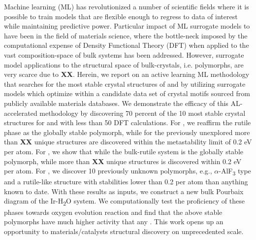 %



%
Machine learning (ML) has revolutionized a number of scientific fields where it is possible to train models that are flexible enough to regress to data of interest while maintaining predictive power.
%
Particular impact of ML surrogate models to  have been in the field of materials science,
where the bottle-neck imposed by the computational expense of Density Functional Theory (DFT) when applied to the vast composition-space of bulk systems has been addressed.
%
However, surrogate model applications to the structural space of bulk-crystals, i.e. polymorphs, are very scarce due to {\bf XX}.
%
Herein, we report on an active learning ML methodology that searches for the most stable crystal structures of \IrOtwo and \IrOthree by utilizing surrogate models which optimize within a candidate data set of crystal motifs sourced from publicly available materials databases.
We demonstrate the efficacy of this AL-accelerated methodology by discovering 70 percent of the 10 most stable crystal structures for \IrOtwo and \IrOthree with less than 50 DFT calculations.
For \IrOtwo, we reaffirm the rutile phase as the globally stable polymorph,
while for the previously unexplored \IrOthree more than {\bf XX} unique structures are discovered within the metastability limit of 0.2 eV per atom.
%
For \IrOtwo, we show that while the bulk-rutile system is the globally stable polymorph,
while more than {\bf XX} unique structures is discovered within 0.2 eV per atom.
For \IrOthree, we discover 10 previously unknown polymorphs, e.g.,
$\alpha$-AlF\textsubscript{3} type and a rutile-like \IrOthree structure with stabilities lower than 0.2 per atom than anything known to date.
%
With these results as inputs, we construct a new bulk Pourbaix diagram of the Ir-H\textsubscript{2}O system.
%
We computationally test the proficiency of these phases towards oxygen evolution reaction and find that the above stable \IrOthree polymorphs have much higher activity that any \IrOtwo.
%
This work opens up an opportunity to materials/catalysts structural discovery on unprecedented scale.
